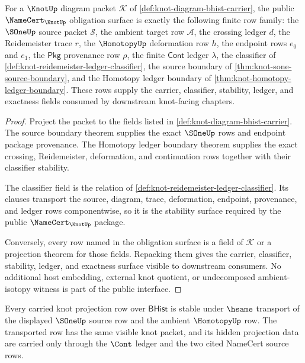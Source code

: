 \begin{theorem}
\label{thm:knot-namecert-obligation-surface}
For a $\KnotUp$ diagram packet $\mathcal{K}$ of
\autoref{def:knot-diagram-bhist-carrier}, the public
$\NameCert_{\KnotUp}$ obligation surface is exactly the following finite row
family: the $\SOneUp$ source packet $\mathcal{S}$, the ambient target row
$\mathcal{A}$, the crossing ledger $d$, the Reidemeister trace $r$, the
$\HomotopyUp$ deformation row $h$, the endpoint rows $e_0$ and $e_1$, the
$\mathsf{Pkg}$ provenance row $\rho$, the finite $\mathsf{Cont}$ ledger
$\lambda$, the classifier of
\autoref{def:knot-reidemeister-ledger-classifier}, the source boundary of
\autoref{thm:knot-sone-source-boundary}, and the Homotopy ledger boundary of
\autoref{thm:knot-homotopy-ledger-boundary}. These rows supply the carrier,
classifier, stability, ledger, and exactness fields consumed by downstream
knot-facing chapters.
\end{theorem}
\begin{proof}
Project the packet to the fields listed in
\autoref{def:knot-diagram-bhist-carrier}. The source boundary theorem supplies
the exact $\SOneUp$ rows and endpoint package provenance. The Homotopy ledger
boundary theorem supplies the exact crossing, Reidemeister, deformation, and
continuation rows together with their classifier stability.

The classifier field is the relation of
\autoref{def:knot-reidemeister-ledger-classifier}. Its clauses transport the
source, diagram, trace, deformation, endpoint, provenance, and ledger rows
componentwise, so it is the stability surface required by the public
$\NameCert_{\KnotUp}$ package.

Conversely, every row named in the obligation surface is a field of
$\mathcal{K}$ or a projection theorem for those fields. Repacking them gives
the carrier, classifier, stability, ledger, and exactness surface visible to
downstream consumers. No additional host embedding, external knot quotient, or
undecomposed ambient-isotopy witness is part of the public interface.
\end{proof}

\begin{theorem}\label{thm:knot-projection-stability-obligation}
Every carried knot projection row over $\mathsf{BHist}$ is stable under $\hsame$ transport of the displayed $\SOneUp$ source row and the ambient $\HomotopyUp$ row. The transported row has the same visible knot packet, and its hidden projection data are carried only through the $\Cont$ ledger and the two cited NameCert source rows.
\end{theorem}

